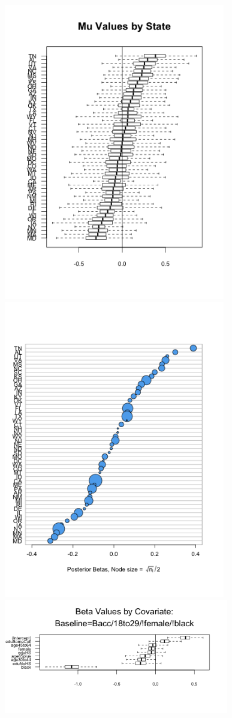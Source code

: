 \documentclass[12pt,letterpaper]{article}\usepackage[]{graphicx}\usepackage[]{color}
\begin{document}
\includegraphics[height=13cm, keepaspectratio]{polls-mus.png}
\includegraphics[height=13cm, keepaspectratio]{polls-posterior-mus.png}\\
\includegraphics[height=5cm, keepaspectratio]{polls-betas.png}
\end{document}
